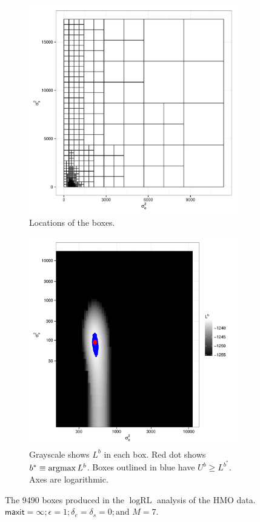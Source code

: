 \documentclass{report}
\newcommand{\textcompute}{\textsf}
\newcommand{\RLorig}{\text{RL}}
\newcommand{\logRLorig}{\log\RLorig}
\newcommand{\maxit}{\textcompute{maxit}}
\newcommand{\argmax}{\operatornamewithlimits{argmax}}
\begin{document}
\begin{figure}
  \begin{subfigure}{.5\textwidth}
	\centering
	\includegraphics[width=.8\linewidth]{figs/hmo_HH11_boxes.pdf}
	\caption{Locations of the boxes.}
	\label{fig:hmoboxes}
  \end{subfigure}
  \begin{subfigure}{.5\textwidth}
	\centering
	\includegraphics[width=.8\linewidth]{figs/hmo_HH11_rll.pdf}
	\caption{Grayscale shows $L^b$ in each box.  Red dot shows $b^* \equiv\argmax L^b$.
	Boxes outlined in blue have $U^b \ge L^{b^*}$.  Axes are logarithmic.}
	\label{fig:hmorll}
  \end{subfigure}
  \caption{The 9490 boxes produced in the
	$\logRLorig$ analysis of the HMO data. $\maxit=\infty; \epsilon=1;
	\delta_e= \delta_s= 0; \text{and\ } M=7$.}
  \label{fig:hmo1}
\end{figure}
\end{document}
